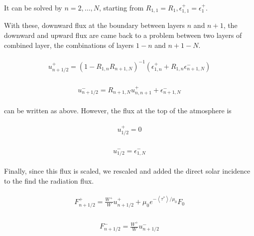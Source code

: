 It can be solved by \(n=2,\dots, N\), starting from
\(R_{1,1}=R_{1}, \epsilon_{1,1}^{+}=\epsilon_{1}^{+}\).

With these, downward flux at the boundary between layers \(n\) and
\(n+1\), the downward and upward flux are came back to a problem between
two layers of combined layer, the combinations of layers \(1-n\) and
\(n+1-N\).

\begin{eqnarray}
\begin{array}{c}
u_{n+1 / 2}^{+}=\left(1-R_{1, n} R_{n+1, N}\right)^{-1}\left(\epsilon_{1, n}^{+}+R_{1, n} \epsilon_{n+1, N}^{-}\right)
\end{array}
\end{eqnarray}

\begin{eqnarray}
\begin{array}{c}
u_{n+1 / 2}^{-}=R_{n+1, N} u_{n, n+1}^{+}+\epsilon_{n+1, N}^{-}
\end{array}
\end{eqnarray}

can be written as above. However, the flux at the top of the atmosphere
is

\begin{eqnarray}
\begin{array}{c}
u_{1 / 2}^{+}=0
\end{array}
\end{eqnarray}

\begin{eqnarray}
\begin{array}{c}
u_{1 / 2}^{-}=\epsilon_{1, N}^{-}
\end{array}
\end{eqnarray}

Finally, since this flux is scaled, we rescaled and added the direct
solar incidence to the find the radiation flux.

\begin{eqnarray}
\begin{array}{c}
F_{n+1 / 2}^{+}=\frac{W^{+}}{W} u_{n+1 / 2}^{+}+\mu_{0} e^{-\left\langle\tau^{*}\right\rangle / \mu_{0}} F_{0}
\end{array}
\end{eqnarray}

\begin{eqnarray}
\begin{array}{c}
F_{n+1 / 2}^{-}=\frac{W^{+}}{W} u_{n+1 / 2}^{-}
\end{array}
\end{eqnarray}

